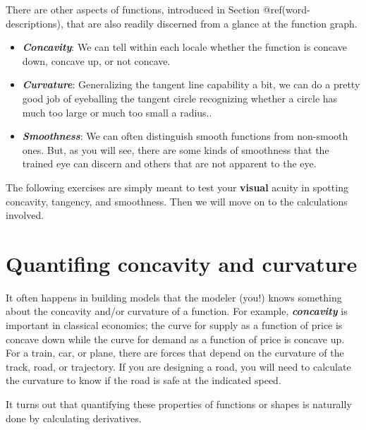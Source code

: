 \documentclass[
  letterpaper,
  DIV=11,
  numbers=noendperiod,
  oneside]{scrreprt}
\providecommand{\tightlist}{%
  \setlength{\itemsep}{0pt}\setlength{\parskip}{0pt}}
\begin{document}
There are other aspects of functions, introduced in Section
@ref(word-descriptions), that are also readily discerned from a glance
at the function graph.

\begin{itemize}
\tightlist
\item
  \textbf{\emph{Concavity}}: We can tell within each locale whether the
  function is concave down, concave up, or not concave.
\item
  \textbf{\emph{Curvature}}: Generalizing the tangent line capability a
  bit, we can do a pretty good job of eyeballing the tangent circle
  recognizing whether a circle has much too large or much too small a
  radius..
\item
  \textbf{\emph{Smoothness}}: We can often distinguish smooth functions
  from non-smooth ones. But, as you will see, there are some kinds of
  smoothness that the trained eye can discern and others that are not
  apparent to the eye.
\end{itemize}

The following exercises are simply meant to test your \textbf{visual}
acuity in spotting concavity, tangency, and smoothness. Then we will
move on to the calculations involved.

\hypertarget{quantifing-concavity-and-curvature}{%
\section{Quantifing concavity and
curvature}\label{quantifing-concavity-and-curvature}}

It often happens in building models that the modeler (you!) knows
something about the concavity and/or curvature of a function. For
example, \textbf{\emph{concavity}} is important in classical economics;
the curve for supply as a function of price is concave down while the
curve for demand as a function of price is concave up. For a train, car,
or plane, there are forces that depend on the curvature of the track,
road, or trajectory. If you are designing a road, you will need to
calculate the curvature to know if the road is safe at the indicated
speed.

It turns out that quantifying these properties of functions or shapes is
naturally done by calculating derivatives.
\end{document}
